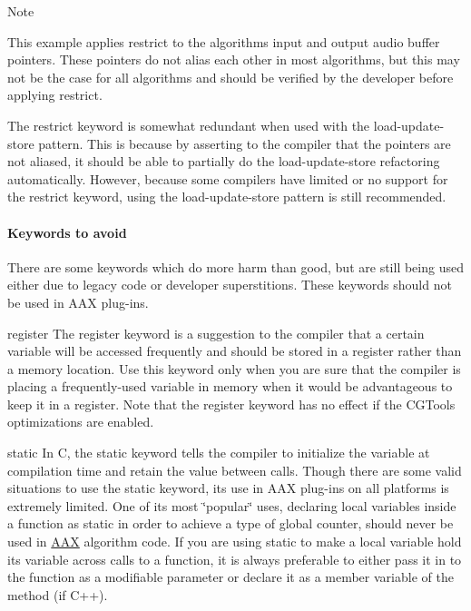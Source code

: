 \begin{DoxyNote}{Note}

\begin{DoxyItemize}
\item This example applies {\ttfamily restrict }to the algorithm\textquotesingle{}s input and output audio buffer pointers. These pointers do not alias each other in most algorithms, but this may not be the case for all algorithms and should be verified by the developer before applying {\ttfamily restrict}. 


\item The {\ttfamily restrict} keyword is somewhat redundant when used with the load-\/update-\/store pattern. This is because by asserting to the compiler that the pointers are not aliased, it should be able to partially do the load-\/update-\/store refactoring automatically. However, because some compilers have limited or no support for the {\ttfamily restrict} keyword, using the load-\/update-\/store pattern is still recommended.  
\end{DoxyItemize}
\end{DoxyNote}
\hypertarget{a00832_subsubsection__keywords_to_avoid_}{}\paragraph{Keywords to avoid}\label{a00832_subsubsection__keywords_to_avoid_}
 There are some keywords which do more harm than good, but are still being used either due to legacy code or developer superstitions. These keywords should not be used in A\+AX plug-\/ins.


\begin{DoxyItemize}
\item {\ttfamily register}  The {\ttfamily register} keyword is a suggestion to the compiler that a certain variable will be accessed frequently and should be stored in a register rather than a memory location. Use this keyword only when you are sure that the compiler is placing a frequently-\/used variable in memory when it would be advantageous to keep it in a register. Note that the {\ttfamily register} keyword has no effect if the C\+G\+Tools optimizations are enabled.  


\item {\ttfamily static}  In C, the {\ttfamily static} keyword tells the compiler to initialize the variable at compilation time and retain the value between calls. Though there are some valid situations to use the {\ttfamily static} keyword, its use in A\+AX plug-\/ins on all platforms is extremely limited. One of its most \char`\"{}popular\char`\"{} uses, declaring local variables inside a function as {\ttfamily static} in order to achieve a type of global counter, should never be used in \mbox{\hyperlink{a00852}{A\+AX}} algorithm code. If you are using {\ttfamily static} to make a local variable hold its variable across calls to a function, it is always preferable to either pass it in to the function as a modifiable parameter or declare it as a member variable of the method (if C++).  


\end{DoxyItemize}


